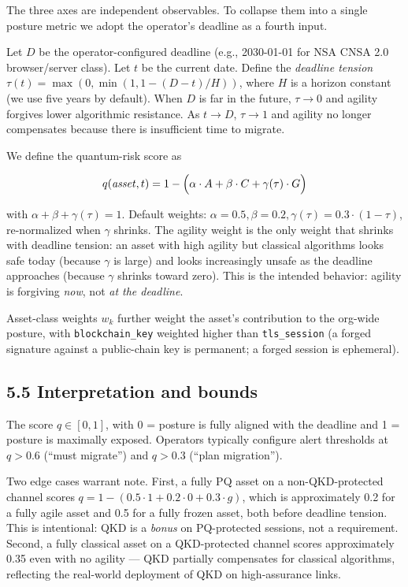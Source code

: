 The three axes are independent observables. To collapse them into a
single posture metric we adopt the operator's deadline as a fourth
input.

Let \(D\) be the operator-configured deadline (e.g., 2030-01-01 for NSA
CNSA 2.0 browser/server class). Let \(t\) be the current date. Define
the \emph{deadline tension} \(\tau(t) = \max(0,
\min(1, 1 - (D-t)/H))\), where \(H\) is a horizon constant (we use five
years by default). When \(D\) is far in the future, \(\tau \to 0\) and
agility forgives lower algorithmic resistance. As \(t \to D\),
\(\tau \to 1\) and agility no longer compensates because there is
insufficient time to migrate.

We define the quantum-risk score as

\[
q(\mathit{asset}, t) = 1 - \Bigl( \alpha \cdot A + \beta \cdot C +
  \gamma(\tau) \cdot G \Bigr)
\]

with \(\alpha + \beta + \gamma(\tau) = 1\). Default weights:
\(\alpha = 0.5, \beta = 0.2, \gamma(\tau) = 0.3 \cdot (1-\tau)\),
re-normalized when \(\gamma\) shrinks. The agility weight is the only
weight that shrinks with deadline tension: an asset with high agility
but classical algorithms looks safe today (because \(\gamma\) is large)
and looks increasingly unsafe as the deadline approaches (because
\(\gamma\) shrinks toward zero). This is the intended behavior: agility
is forgiving \emph{now}, not \emph{at the deadline}.

Asset-class weights \(w_k\) further weight the asset's contribution to
the org-wide posture, with \texttt{blockchain\_key} weighted higher than
\texttt{tls\_session} (a forged signature against a public-chain key is
permanent; a forged session is ephemeral).

\subsection{5.5 Interpretation and
bounds}\label{interpretation-and-bounds}

The score \(q \in [0, 1]\), with 0 = posture is fully aligned with the
deadline and 1 = posture is maximally exposed. Operators typically
configure alert thresholds at \(q > 0.6\) (``must migrate'') and
\(q > 0.3\) (``plan migration'').

Two edge cases warrant note. First, a fully PQ asset on a
non-QKD-protected channel scores \(q = 1 - (0.5 \cdot 1 + 0.2 \cdot
0 + 0.3 \cdot g)\), which is approximately 0.2 for a fully agile asset
and 0.5 for a fully frozen asset, both before deadline tension. This is
intentional: QKD is a \emph{bonus} on PQ-protected sessions, not a
requirement. Second, a fully classical asset on a QKD-protected channel
scores approximately 0.35 even with no agility --- QKD partially
compensates for classical algorithms, reflecting the real-world
deployment of QKD on high-assurance links.

